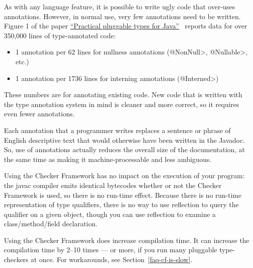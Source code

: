 As with any language feature, it is possible to write ugly code that
over-uses annotations.  However, in normal use, very few annotations need
to be written.  Figure 1 of the paper
\href{https://homes.cs.washington.edu/~mernst/pubs/pluggable-checkers-issta2008-abstract.html}{``Practical
  pluggable types for Java''}~\cite{PapiACPE2008} reports data for over
350,000 lines of type-annotated code:

\begin{itemize}
\item
    1 annotation per 62 lines for nullness annotations (\<@NonNull>, \<@Nullable>, etc.)
\item
    1 annotation per 1736 lines for interning annotations (\<@Interned>)
\end{itemize}


These numbers are for annotating existing code.  New code that
is written with the type annotation system in mind is cleaner and more
correct, so it requires even fewer annotations.

Each annotation that a programmer writes replaces a sentence or phrase of
English descriptive text that would otherwise have been written in the
Javadoc.  So, use of annotations actually reduces the overall size of the
documentation, at the same time as making it machine-processable
and less ambiguous.



Using the Checker Framework has no impact on the execution of your program:
the javac compiler emits identical bytecodes whether or not the Checker
Framework is used, so there is no run-time effect.  Because there is no run-time
representation of type qualifiers, there is no way to use reflection to
query the qualifier on a given object, though you can use reflection to
examine a class/method/field declaration.

Using the Checker Framework does increase compilation time.
It can increase the compilation time by 2--10 times --- or more, if you run
many pluggable type-checkers at once.  For workarounds, see
Section~\ref{faq-cf-is-slow}.



